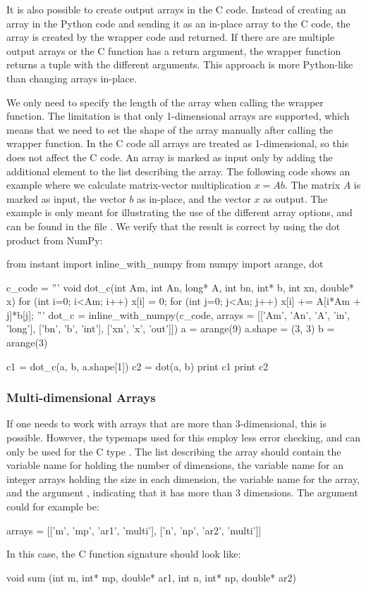 It is also possible to create output arrays in the C code. Instead of creating
an array in the Python code and sending it as an in-place array to the C
code, the array is created by the wrapper code and returned. If there are are
multiple output arrays or the C function has a return argument, the wrapper
function returns a tuple with the different arguments. This approach is more
Python-like than changing arrays in-place. 

We only need to specify the length of the array when calling the wrapper
function. The limitation is that only 1-dimensional arrays are supported,
which means that we need to set the shape of the array manually after calling
the wrapper function. In the C code all arrays are treated as 1-dimensional,
so this does not affect the C code. An array is marked as input only by adding
the additional element  to the list describing the array. The
following code shows an example where we calculate matrix-vector
multiplication $x = Ab$. The matrix $A$ is marked as input, the vector $b$ as
in-place, and the vector $x$ as output. The example is only meant for
illustrating the use of the different array options, and can be found in the
file . We verify that the result is correct by using
the dot product from NumPy:
\begin{code}
from instant import inline_with_numpy
from numpy import arange, dot

c_code = '''
void dot_c(int Am, int An, long* A, int bn, int* b, int xn, double* x)
{
    for (int i=0; i<Am; i++)
    {
        x[i] = 0;
        for (int j=0; j<An; j++)
        {
            x[i] += A[i*Am + j]*b[j];
        }
    }
}
'''
dot_c = inline_with_numpy(c_code,
                          arrays = [['Am', 'An', 'A', 'in', 'long'],
                                    ['bn', 'b', 'int'],
                                    ['xn', 'x', 'out']])
a = arange(9)
a.shape = (3, 3)
b = arange(3)

c1 = dot_c(a, b, a.shape[1])
c2 = dot(a, b)
print c1
print c2
\end{code}


\subsubsection{Multi-dimensional Arrays}
If one needs to work with arrays that are more than 3-dimensional, this is
possible. However, the typemaps used for this employ less error checking, and
can only be used for the C type . The list describing the array
should contain the variable name for holding the number of dimensions, the
variable name for an integer arrays holding the size in each dimension, the
variable name for the array, and the argument , indicating that
it has more than 3 dimensions. The  argument could for example be:
\begin{code}
arrays = [['m', 'mp', 'ar1', 'multi'],
          ['n', 'np', 'ar2', 'multi']]
\end{code}
In this case, the C function signature should look like:
\begin{code}
void sum (int m, int* mp, double* ar1, int n, int* np, double* ar2)
\end{code}

